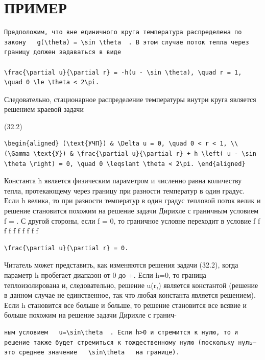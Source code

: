 \documentclass[
  ukrainian,
]{article}
\begin{document}
\section{ПРИМЕР}\label{ux43fux440ux438ux43cux435ux440-1}

\begin{verbatim}
Предположим, что вне единичного круга температура распределена по закону   g(\theta) = \sin \theta  . В этом случае поток тепла через границу должен задаваться в виде

\frac{\partial u}{\partial r} = -h(u - \sin \theta), \quad r = 1, \quad 0 \le \theta < 2\pi.
\end{verbatim}

Следовательно, стационарное распределение температуры внутри круга
является решением краевой задачи

(32.2)

\begin{verbatim}
\begin{aligned} (\text{УЧП}) & \Delta u = 0, \quad 0 < r < 1, \\ (\Gamma \text{У}) & \frac{\partial u}{\partial r} + h \left( u - \sin \theta \right) = 0, \quad 0 \leqslant \theta < 2\pi. \end{aligned}
\end{verbatim}

Константа h является физическим параметром и численно равна количеству
тепла, протекающему через границу при разности температур в один градус.
Если h велика, то при разности температур в один градус тепловой поток
велик и решение становится похожим на решение задачи Дирихле с граничным
условием f = \sin \theta  . С другой стороны, если f = 0, то граничное
условне переходит в условие f f f f f f f f f f

\begin{verbatim}
\frac{\partial u}{\partial r} = 0.
\end{verbatim}

Читатель может представить, как изменяются решения задачи (32.2), когда
параметр h пробегает диапазон от 0 до +\infty  . Если h=0, то граница
теплоизолирована и, следовательно, решение u(r,\theta) является
константой (решение в данном случае не единственное, так что любая
константа является решением). Если h становится все больше и больше, то
решение становится все всявие и больше похожим на решение задачи Дирихле
с гранич-

\begin{verbatim}
ным условием   u=\sin\theta  . Если h>0 и стремится к нулю, то и решение также будет стремиться к тождественному нулю (поскольку нуль—это среднее значение   \sin\theta   на границе).
\end{verbatim}
\end{document}
